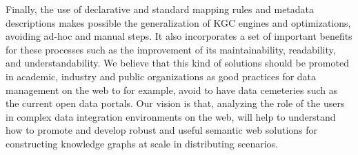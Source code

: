 Finally, the use of declarative and standard mapping rules and metadata descriptions makes possible the generalization of KGC engines and optimizations, avoiding ad-hoc and manual steps. It also incorporates a set of important benefits for these processes such as the improvement of its maintainability, readability, and understandability. We believe that this kind of solutions should be promoted in academic, industry and public organizations as good practices for data management on the web to for example, avoid to have data cemeteries such as the current open data portals. Our vision is that, analyzing the role of the users in complex data integration environments on the web, will help to understand how to promote and develop robust and useful semantic web solutions for constructing knowledge graphs at scale in distributing scenarios.

